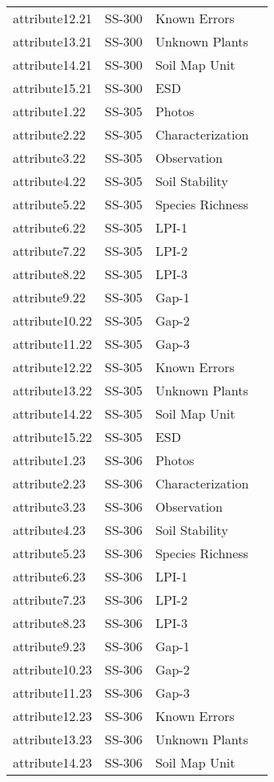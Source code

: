 \documentclass[
]{article}
\begin{document}
\begin{longtable}[]{@{}llll@{}}
attribute12.21 & SS-300 & Known Errors & \\
attribute13.21 & SS-300 & Unknown Plants & \\
attribute14.21 & SS-300 & Soil Map Unit & \\
attribute15.21 & SS-300 & ESD & \\
attribute1.22 & SS-305 & Photos & \\
attribute2.22 & SS-305 & Characterization & \\
attribute3.22 & SS-305 & Observation & \\
attribute4.22 & SS-305 & Soil Stability & \\
attribute5.22 & SS-305 & Species Richness & \\
attribute6.22 & SS-305 & LPI-1 & \\
attribute7.22 & SS-305 & LPI-2 & \\
attribute8.22 & SS-305 & LPI-3 & \\
attribute9.22 & SS-305 & Gap-1 & \\
attribute10.22 & SS-305 & Gap-2 & \\
attribute11.22 & SS-305 & Gap-3 & \\
attribute12.22 & SS-305 & Known Errors & \\
attribute13.22 & SS-305 & Unknown Plants & \\
attribute14.22 & SS-305 & Soil Map Unit & \\
attribute15.22 & SS-305 & ESD & \\
attribute1.23 & SS-306 & Photos & \\
attribute2.23 & SS-306 & Characterization & \\
attribute3.23 & SS-306 & Observation & \\
attribute4.23 & SS-306 & Soil Stability & \\
attribute5.23 & SS-306 & Species Richness & \\
attribute6.23 & SS-306 & LPI-1 & \\
attribute7.23 & SS-306 & LPI-2 & \\
attribute8.23 & SS-306 & LPI-3 & \\
attribute9.23 & SS-306 & Gap-1 & \\
attribute10.23 & SS-306 & Gap-2 & \\
attribute11.23 & SS-306 & Gap-3 & \\
attribute12.23 & SS-306 & Known Errors & \\
attribute13.23 & SS-306 & Unknown Plants & \\
attribute14.23 & SS-306 & Soil Map Unit & \\

\end{longtable}
\end{document}
